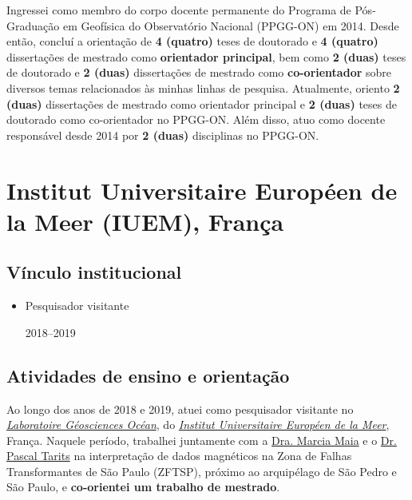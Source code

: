 Ingressei como membro do corpo docente permanente do Programa de Pós-Graduação em
Geofísica do Observatório Nacional (PPGG-ON) em 2014. Desde então, 
concluí a orientação de \textbf{4 (quatro)} teses de doutorado e 
\textbf{4 (quatro)} dissertações de mestrado como \textbf{orientador principal},
bem como \textbf{2 (duas)} teses de doutorado e \textbf{2 (duas)} dissertações de
mestrado como \textbf{co-orientador} sobre diversos temas relacionados às minhas
linhas de pesquisa. Atualmente, oriento \textbf{2 (duas)} dissertações de mestrado
como orientador principal e \textbf{2 (duas)} teses de doutorado como co-orientador
no PPGG-ON. 
Além disso, atuo como docente responsável desde 2014 por \textbf{2 (duas)} disciplinas 
no PPGG-ON.

\clearpage

\section{Institut Universitaire Européen de la Meer (IUEM), França}


\subsection*{Vínculo institucional}


\begin{itemize}
	
	\item[\parbox{0.03\textwidth}{\vspace{-0.3\baselineskip}\faClipboardCheck}]
	{Pesquisador visitante \dotfill \parbox{0.11\textwidth}{\hfill 2018--2019}} 
	
\end{itemize}

\subsection*{Atividades de ensino e orientação}

Ao longo dos anos de 2018 e 2019, atuei como pesquisador visitante no 
\href{https://www-iuem.univ-brest.fr/lgo/le-labo/}{\textit{Laboratoire Géosciences Océan}}, 
do
\href{https://www-iuem.univ-brest.fr/}{\textit{Institut Universitaire Européen de la Meer}},
França.
Naquele período, trabalhei juntamente com a 
\href{https://www-iuem.univ-brest.fr/lgo/equipe/maia-marcia-do-carmo/}{Dra. Marcia Maia} 
e o 
\href{https://www-iuem.univ-brest.fr/lgo/equipe/tarits-pascal/}{Dr. Pascal Tarits} 
na interpretação de dados magnéticos na Zona de Falhas Transformantes de São
Paulo (ZFTSP), próximo ao arquipélago de São Pedro e São Paulo, e
\textbf{co-orientei um trabalho de mestrado}.



